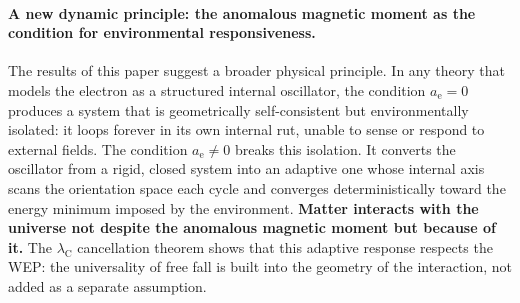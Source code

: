 \documentclass[%
 reprint, amsmath,amssymb, aps, prb, ]{revtex4-2}
\numberwithin{equation}{section}
\newcommand{\lambdaC}{\lambda_{\mathrm{C}}}
\newcommand{\anom}{a_{\mathrm{e}}}
\begin{document}
\paragraph{A new dynamic principle: the anomalous magnetic moment as the condition for environmental responsiveness.}
The results of this paper suggest a broader physical principle.
In any theory that models the electron as a structured internal oscillator, the condition $\anom = 0$ produces a system that is geometrically self-consistent but environmentally isolated: it loops forever in its own internal rut, unable to sense or respond to external fields.
The condition $\anom \neq 0$ breaks this isolation.
It converts the oscillator from a rigid, closed system into an adaptive one whose internal axis scans the orientation space each cycle and converges deterministically toward the energy minimum imposed by the environment.
\textbf{Matter interacts with the universe not despite the anomalous magnetic moment but because of it.}
The $\lambdaC$ cancellation theorem shows that this adaptive response respects the WEP: the universality of free fall is built into the geometry of the interaction, not added as a separate assumption.
\end{document}
